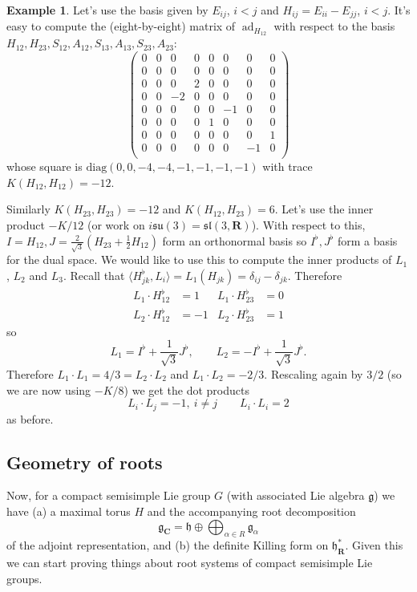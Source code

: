\documentclass[12pt]{article}
\newcommand{\CC}{\mathbf{C}}
\newcommand{\RR}{\mathbf{R}}
\newcommand{\OP}{\operatorname}
\newcommand{\ad}{\OP{ad}}
\newcommand{\diag}{\mathrm{diag}}
\theoremstyle{definition}
\newtheorem{exm}[thm]{Example}
\theoremstyle{check}
\theoremstyle{remark}
\theoremstyle{TheoremNum}
\begin{document}
\begin{exm}
Let's use the basis given by $E_{ij}$, $i<j$ and $H_{ij}=E_{ii}-E_{jj}$, $i<j$. It's easy to compute the (eight-by-eight) matrix of $\ad_{H_{12}}$ with respect to the basis $H_{12},H_{23},S_{12},A_{12},S_{13},A_{13},S_{23},A_{23}$:
\[\left(\begin{array}{cccccccc}
0 & 0 & 0 & 0 & 0 & 0 & 0 & 0\\
0 & 0 & 0 & 0 & 0 & 0 & 0 & 0\\
0 & 0 & 0 & 2 & 0 & 0 & 0 & 0\\
0 & 0 & -2 & 0 & 0 & 0 & 0 & 0\\
0 & 0 & 0 & 0 & 0 & -1 & 0 & 0\\
0 & 0 & 0 & 0 & 1 & 0 & 0 & 0\\
0 & 0 & 0 & 0 & 0 & 0 & 0 & 1\\
0 & 0 & 0 & 0 & 0 & 0 & -1 & 0\\
\end{array}\right)\]
whose square is $\diag(0,0,-4,-4,-1,-1,-1,-1)$ with trace $K(H_{12},H_{12})=-12$.

Similarly $K(H_{23},H_{23})=-12$ and $K(H_{12},H_{23})=6$. Let's use the inner product $-K/12$ (or work on $i\mathfrak{su}(3)=\mathfrak{sl}(3,\RR)$). With respect to this, $I=H_{12},J=\frac{2}{\sqrt{3}}\left(H_{23}+\frac{1}{2}H_{12}\right)$ form an orthonormal basis so $I^{\flat},J^{\flat}$ form a basis for the dual space. We would like to use this to compute the inner products of $L_1$, $L_2$ and $L_3$. Recall that $\langle H_{jk}^{\flat},L_i\rangle=L_1(H_{jk})=\delta_{ij}-\delta_{jk}$. Therefore
\begin{align*}
L_1\cdot H_{12}^{\flat}&=1 & L_1\cdot H_{23}^{\flat}&=0\\
L_2\cdot H_{12}^{\flat}&=-1 & L_2\cdot H_{23}^{\flat}&=1
\end{align*}
so
\[L_1=I^{\flat}+\frac{1}{\sqrt{3}}J^{\flat},\qquad L_2=-I^{\flat}+\frac{1}{\sqrt{3}}J^{\flat}.\]
Therefore $L_1\cdot L_1=4/3=L_2\cdot L_2$ and $L_1\cdot L_2=-2/3$. Rescaling again by $3/2$ (so we are now using $-K/8$) we get the dot products
\[L_i\cdot L_j=-1,\ i\neq j\qquad L_i\cdot L_i=2\]
as before.
\end{exm}

\subsection{Geometry of roots}

Now, for a compact semisimple Lie group $G$ (with associated Lie algebra $\mathfrak{g}$) we have (a) a maximal torus $H$ and the accompanying root decomposition
\[\mathfrak{g}_{\CC}=\mathfrak{h}\oplus\bigoplus_{\alpha\in R}\mathfrak{g}_{\alpha}\]
of the adjoint representation, and (b) the definite Killing form on $\mathfrak{h}_{\RR}^*$. Given this we can start proving things about root systems of compact semisimple Lie groups.
\end{document}
